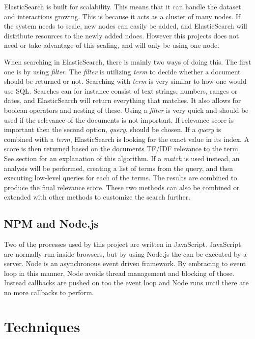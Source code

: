 ElasticSearch is built for scalability. This means that it can handle the dataset and interactions growing. This is because it acts as a cluster of many nodes. If the system needs to scale, new nodes can easily be added, and ElasticSearch will distribute resources to the newly added ndoes. However this projects does not need or take advantage of this scaling, and will only be using one node.

When searching in ElasticSearch, there is mainly two ways of doing this. The first one is by using \textit{filter}. The \textit{filter} is utilizing \textit{term} to decide whether a document should be returned or not. Searching with \textit{term} is very similar to how one would use SQL. %
Searches can for instance consist of text strings, numbers, ranges or dates, and ElasticSearch will return everything that matches. It also allows for boolean operators and nesting of these. Using a \textit{filter} is very quick and should be used if the relevance of the documents is not important. If relevance score is important then the second option, \textit{query}, should be chosen. If a \textit{query} is combined with a \textit{term}, ElasticSearch is looking for the exact value in its index. A score is then returned based on the documents TF/IDF relevance to the term. See section \label{tfidf} for an explanation of this algorithm.%
If a \textit{match} is used instead, an analysis will be performed, creating a list of terms from the query, and then executing low-level queries for each of the terms. The results are combined to produce the final relevance score. These two methods can also be combined or extended with other methods to customize the search further.


\subsection{NPM and Node.js}
Two of the processes used by this project are written in JavaScript. JavaScript are normally run inside browsers, but by using Node.js\cite{node} the can be executed by a server. Node is an asynchronous event driven framework. By embracing to event loop in this manner, Node avoids thread management and blocking of those. Instead callbacks are pushed on too the event loop and Node runs until there are no more callbacks to perform.


\section{Techniques}

